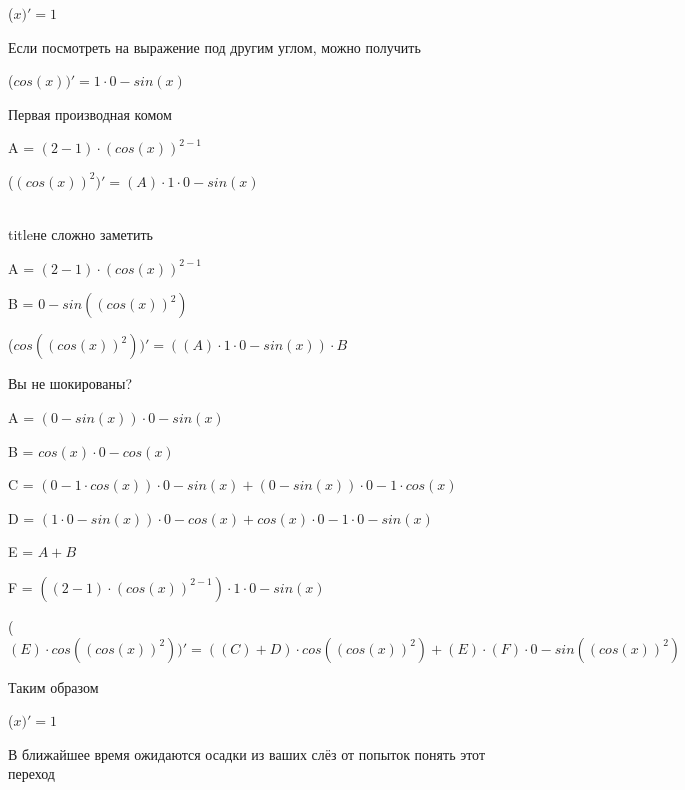 \documentclass[12pt,a4paper,fleqn]{article}
\begin{document}
\begin{center}
 ($x)'
  = 1$\end{center}
Если посмотреть на выражение под другим углом, можно получить

\begin{center}
 ($cos(x))'
  = 1 \cdot 0-sin(x)$\end{center}
Первая производная комом\cite{link2}

\begin{center}
A = $(2-1) \cdot (cos(x))^{2-1}$\end{center}
\begin{center}
 ($(cos(x))^{2})'
  = (A) \cdot 1 \cdot 0-sin(x)$\end{center}
\\ title{не сложно заметить} 

\begin{center}
A = $(2-1) \cdot (cos(x))^{2-1}$\end{center}
\begin{center}
B = $0-sin((cos(x))^{2})$\end{center}
\begin{center}
 ($cos((cos(x))^{2}))'
  = ((A) \cdot 1 \cdot 0-sin(x)) \cdot B$\end{center}
Вы не шокированы?\cite{link3}

\begin{center}
A = $(0-sin(x)) \cdot 0-sin(x)$\end{center}
\begin{center}
B = $cos(x) \cdot 0-cos(x)$\end{center}
\begin{center}
C = $(0-1 \cdot cos(x)) \cdot 0-sin(x)+(0-sin(x)) \cdot 0-1 \cdot cos(x)$\end{center}
\begin{center}
D = $(1 \cdot 0-sin(x)) \cdot 0-cos(x)+cos(x) \cdot 0-1 \cdot 0-sin(x)$\end{center}
\begin{center}
E = $A+B$\end{center}
\begin{center}
F = $((2-1) \cdot (cos(x))^{2-1}) \cdot 1 \cdot 0-sin(x)$\end{center}
\begin{center}
 ($(E) \cdot cos((cos(x))^{2}))'
  = ((C)+D) \cdot cos((cos(x))^{2})+(E) \cdot (F) \cdot 0-sin((cos(x))^{2})$\end{center}
Таким образом

\begin{center}
 ($x)'
  = 1$\end{center}
В ближайшее время ожидаются осадки из ваших слёз от попыток понять этот переход
\end{document}
